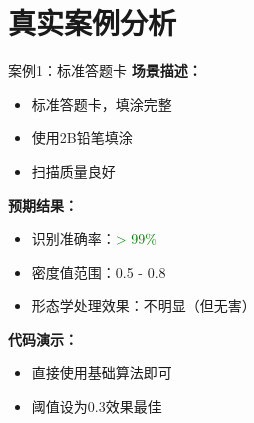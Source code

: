 \section{真实案例分析}

\begin{frame}{案例1：标准答题卡}
    \textbf{场景描述：}
    \begin{itemize}
        \item 标准答题卡，填涂完整
        \item 使用2B铅笔填涂
        \item 扫描质量良好
    \end{itemize}

    \vspace{0.3cm}

    \textbf{预期结果：}
    \begin{itemize}
        \item 识别准确率：\textcolor{green}{> 99\%}
        \item 密度值范围：0.5 - 0.8
        \item 形态学处理效果：不明显（但无害）
    \end{itemize}

    \vspace{0.3cm}

    \textbf{代码演示：}
    \begin{itemize}
        \item 直接使用基础算法即可
        \item 阈值设为0.3效果最佳
    \end{itemize}
\end{frame}

